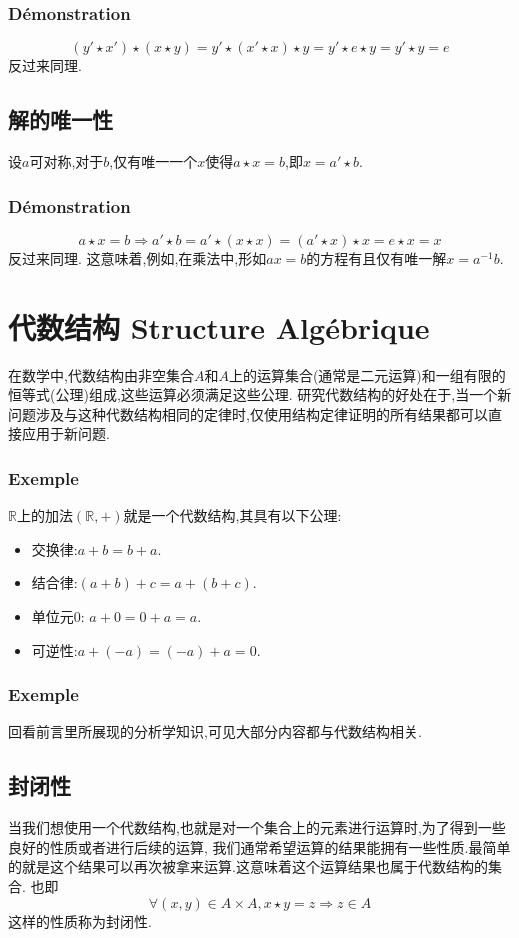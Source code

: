 \documentclass[12pt, a4paper, oneside]{ctexbook}
\begin{document}
  \subsubsection{Démonstration}
  $$
    (y'\star x')\star(x\star y)=y'\star (x'\star x)\star y=y'\star e\star y=y'\star y=e
  $$反过来同理.
  \subsection{解的唯一性}
  设$a$可对称,对于$b$,仅有唯一一个$x$使得$a\star x=b$,即$x=a'\star b$.
  \subsubsection{Démonstration}
  $$
    a\star x=b\Rightarrow a'\star b=a'\star (x\star x)=(a'\star x)\star x=e\star x=x
  $$反过来同理.
  这意味着,例如,在乘法中,形如$ax=b$的方程有且仅有唯一解$x=a^{-1}b$.

\section{代数结构 Structure Algébrique}
  在数学中,代数结构由非空集合$A$和$A$上的运算集合(通常是二元运算)和一组有限的恒等式(公理)组成,这些运算必须满足这些公理.
  研究代数结构的好处在于,当一个新问题涉及与这种代数结构相同的定律时,仅使用结构定律证明的所有结果都可以直接应用于新问题.
  \subsubsection{Exemple}
  $\mathbb{R}$上的加法$(\mathbb{R},+)$就是一个代数结构,其具有以下公理:
  \begin{itemize}
    \item 交换律:$a+b=b+a$.
    \item 结合律:$(a+b)+c=a+(b+c)$.
    \item 单位元0:  $a+0=0+a=a$.
    \item 可逆性:$a+(-a)=(-a)+a=0$.
  \end{itemize}
  \subsubsection{Exemple}
  回看前言里所展现的分析学知识,可见大部分内容都与代数结构相关.
  \subsection{封闭性}
  当我们想使用一个代数结构,也就是对一个集合上的元素进行运算时,为了得到一些良好的性质或者进行后续的运算,
  我们通常希望运算的结果能拥有一些性质.最简单的就是这个结果可以再次被拿来运算.这意味着这个运算结果也属于代数结构的集合.
  也即$$\forall (x,y)\in A\times A, x\star y=z \Rightarrow z\in A$$这样的性质称为封闭性.
\end{document}

